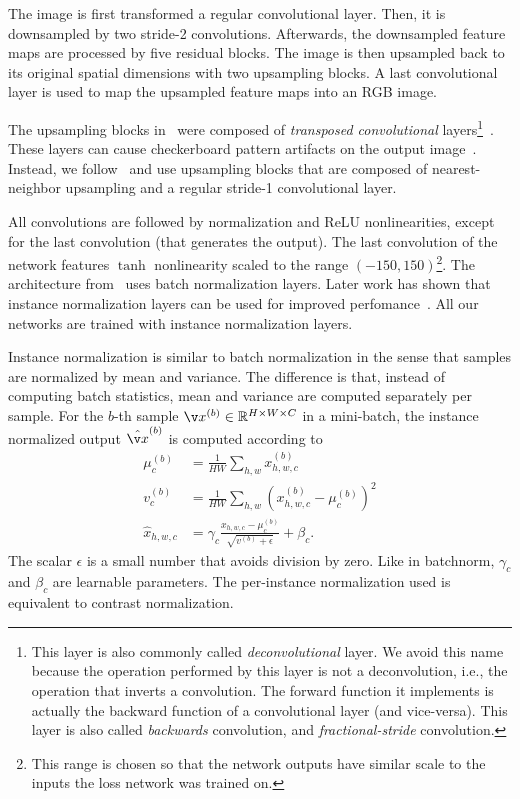 The image is first transformed a regular convolutional layer. Then, it is downsampled by two stride-2 convolutions. Afterwards, the downsampled feature maps are processed by five residual blocks. The image is then upsampled back to its original spatial dimensions with two upsampling blocks. A last convolutional layer is used to map the upsampled feature maps into an RGB image.

The upsampling blocks in~\cite{johnson2016perceptual} were composed of \textit{transposed convolutional} layers\footnote{This layer is also commonly called \textit{deconvolutional} layer. We avoid this name because the operation performed by this layer is not a deconvolution, i.e., the operation that inverts a convolution. The forward function it implements is actually the backward function of a convolutional layer (and vice-versa). This layer is also called \textit{backwards} convolution, and \textit{fractional-stride} convolution.}~\cite{long2015fully}. These layers can cause checkerboard pattern artifacts on the output image~\cite{odena2016deconvolution}. Instead, we follow~\cite{dumoulin2016learned} and use upsampling blocks that are composed of nearest-neighbor upsampling and a regular stride-1 convolutional layer.

All convolutions are followed by normalization and ReLU nonlinearities, except for the last convolution (that generates the output). The last convolution of the network features $\tanh$ nonlinearity scaled to the range $(-150, 150)$\footnote{This range is chosen so that the network outputs have similar scale to the inputs the loss network was trained on.}. The architecture from~\cite{johnson2016perceptual} uses batch normalization layers. Later work has shown that instance normalization layers can be used for improved perfomance~\cite{ulyanov2016instance}. All our networks are trained with instance normalization layers.

Instance normalization is similar to batch normalization in the sense that samples are normalized by mean and variance. The difference is that, instead of computing batch statistics, mean and variance are computed separately per sample. For the $b$-th sample $\v x^{(b)} \in \mathbb{R}^{H\times W\times C}$ in a mini-batch, the instance normalized output $\hat{\v x}^{(b)}$ is computed according to
\begin{equation}
\begin{split}
\mu_c^{(b)} &= \frac{1}{HW}\sum_{h,w}x^{(b)}_{h,w,c}\\
v_c^{(b)} &= \frac{1}{HW}\sum_{h,w}\left(x^{(b)}_{h,w,c} - \mu_c^{(b)}\right)^2\\
\hat{x}_{h,w,c} &= \gamma_c\frac{x_{h,w,c} - \mu_c^{(b)}}{\sqrt{v^{(b)} + \epsilon}} + \beta_c.
\end{split}
\end{equation}
The scalar $\epsilon$ is a small number that avoids division by zero. Like in batchnorm, $\gamma_c$ and $\beta_c$ are learnable parameters. The per-instance normalization used is equivalent to contrast normalization.

